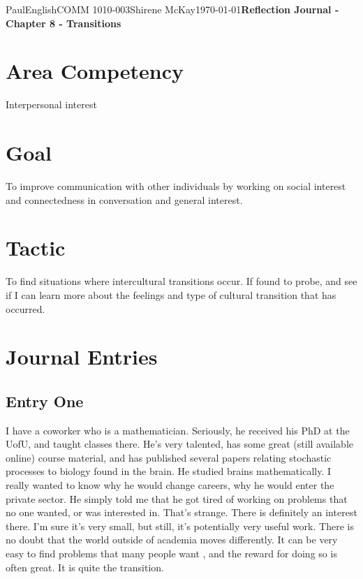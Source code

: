 \documentclass[12pt,letterpaper]{article}
\begin{document}
\begin{mla}{Paul}{English}{COMM 1010-003}{Shirene
    McKay}{\today}{\textbf{Reflection Journal - Chapter 8 - Transitions}}
    
\section{Area Competency}

Interpersonal interest 

\section{Goal}

To improve communication with other individuals by working on social interest and connectedness in conversation and general interest.

\section{Tactic}

To find situations where intercultural transitions occur. If found to probe, and see if I can learn more about the feelings and type of cultural transition that has occurred.

\section{Journal Entries}

\subsection{Entry One}

I have a coworker who is a mathematician. Seriously, he received his PhD at the UofU, and taught classes there. He's very talented, has some great (still available online) course material, and has published several papers relating stochastic processes to biology found in the brain. He studied brains mathematically. I really wanted to know why he would change careers, why he would enter the private sector. He simply told me that he got tired of working on problems that no one wanted, or was interested in. That's strange. There is definitely an interest there. I'm sure it's very small, but still, it's potentially very useful work. There is no doubt that the world outside of academia moves differently. It can be very easy to find problems that many people want , and the reward for doing so is often great. It is quite the transition.


\end{mla}
\end{document}

